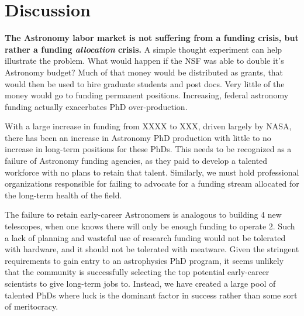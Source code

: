 \documentclass[preprint2]{aastex}
\begin{document}
\section{Discussion}

{\bf{The Astronomy labor market is not suffering from a funding crisis, but rather a funding {\emph{allocation}} crisis.}} A simple thought experiment can help illustrate the problem. What would happen if the NSF was able to double it's Astronomy budget? Much of that money would be distributed as grants, that would then be used to hire graduate students and post docs. Very little of the money would go to funding permanent positions. Increasing, federal astronomy funding actually exacerbates PhD over-production. 

With a large increase in funding from XXXX to XXX, driven largely by NASA, there has been an increase in Astronomy PhD production with little to no increase in long-term positions for these PhDs.  This needs to be recognized as a failure of Astronomy funding agencies, as they paid to develop a talented workforce with no plans to retain that talent. Similarly, we must hold professional organizations responsible for failing to advocate for a funding stream allocated for the long-term health of the field.  

The failure to retain early-career Astronomers is analogous to building 4 new telescopes, when one knows there will only be enough funding to operate 2.  Such a lack of planning and wasteful use of research funding would not be tolerated with hardware, and it should not be tolerated with meatware. Given the stringent requirements to gain entry to an astrophysics PhD program, it seems unlikely that the community is successfully selecting the top potential early-career scientists to give long-term jobs to. Instead, we have created a large pool of talented PhDs where luck is the dominant factor in success rather than some sort of meritocracy. 

\end{document}
